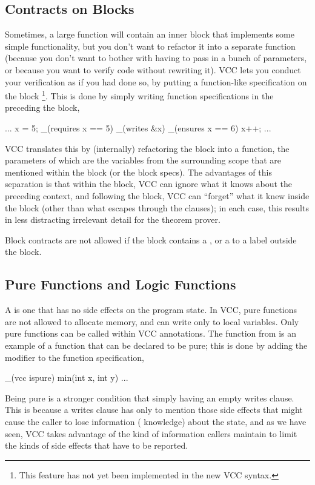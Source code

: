\subsection{Contracts on Blocks} 

Sometimes, a large function will contain an inner block that
implements some simple functionality, but you don't want to refactor
it into a separate function (\eg because you don't want to bother with
having to pass in a bunch of parameters, or because you want to verify
code without rewriting it). VCC lets you conduct your verification as
if you had done so, by putting a function-like specification on the
block%
\footnote{
  This feature has not yet been implemented in the new VCC syntax.
}. This is done by simply writing function specifications in the
preceding the block, \eg
\begin{VCC}
...
x = 5;
_(requires x == 5)
_(writes &x)
_(ensures x == 6)
{
  x++;
}
...
\end{VCC}
VCC translates this by (internally) refactoring the block into a
function, the parameters of which are the variables from the
surrounding scope that are mentioned within the block (or the block
specs). The advantages of this separation is that within the block,
VCC can ignore what it knows about the preceding context, and
following the block, VCC can ``forget'' what it knew inside the block
(other than what escapes through the  clauses); in each
case, this results in less distracting irrelevant detail for the
theorem prover.

Block contracts are not allowed if the block contains a ,
or a  to a label outside the block.

\subsection{Pure Functions and Logic Functions}
\label{sect:pureFunctions}
A  is one that has no side effects on the program
state. In VCC, pure functions are not allowed to allocate memory, and can
write only to local variables. Only pure functions can be called within VCC
annotations. The function  from  is an
example of a function that can be declared to be pure; this is done by
adding the modifier  to the function specification,
\eg
\begin{VCC}
_(vcc ispure) min(int x, int y) ...
\end{VCC}

Being pure is a stronger condition that simply having an empty writes
clause. This is because a writes clause has only to mention those side
effects that might cause the caller to lose information (\ie
knowledge) about the state, and as we have seen, VCC takes advantage
of the kind of information callers maintain to limit the kinds of side
effects that have to be reported.

